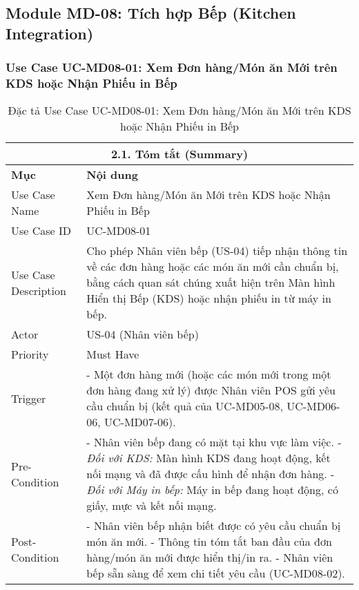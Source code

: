 \subsection{Module MD-08: Tích hợp Bếp (Kitchen Integration)}
\subsubsection{Use Case UC-MD08-01: Xem Đơn hàng/Món ăn Mới trên KDS hoặc Nhận Phiếu in Bếp}
\begin{longtable}{|m{4cm}|p{11cm}|}
\caption{Đặc tả Use Case UC-MD08-01: Xem Đơn hàng/Món ăn Mới trên KDS hoặc Nhận Phiếu in Bếp} \label{tab:uc_md08_01_final_v2} \\
\hline
\multicolumn{2}{|c|}{\textbf{2.1. Tóm tắt (Summary)}} \\
\hline
\textbf{Mục} & \textbf{Nội dung} \\
\hline
\endhead %
\hline
\endfoot %
\hline
\endlastfoot %
Use Case Name & Xem Đơn hàng/Món ăn Mới trên KDS hoặc Nhận Phiếu in Bếp \\
\hline
Use Case ID & UC-MD08-01 \\
\hline
Use Case Description & Cho phép Nhân viên bếp (US-04) tiếp nhận thông tin về các đơn hàng hoặc các món ăn mới cần chuẩn bị, bằng cách quan sát chúng xuất hiện trên Màn hình Hiển thị Bếp (KDS) hoặc nhận phiếu in từ máy in bếp. \\
\hline
Actor & US-04 (Nhân viên bếp) \\
\hline
Priority & Must Have \\
\hline
Trigger & - Một đơn hàng mới (hoặc các món mới trong một đơn hàng đang xử lý) được Nhân viên POS gửi yêu cầu chuẩn bị (kết quả của UC-MD05-08, UC-MD06-06, UC-MD07-06). \\
\hline
Pre-Condition & - Nhân viên bếp đang có mặt tại khu vực làm việc. \newline - \textit{Đối với KDS:} Màn hình KDS đang hoạt động, kết nối mạng và đã được cấu hình để nhận đơn hàng. \newline - \textit{Đối với Máy in bếp:} Máy in bếp đang hoạt động, có giấy, mực và kết nối mạng. \\
\hline
Post-Condition & - Nhân viên bếp nhận biết được có yêu cầu chuẩn bị món ăn mới. \newline - Thông tin tóm tắt ban đầu của đơn hàng/món ăn mới được hiển thị/in ra. \newline - Nhân viên bếp sẵn sàng để xem chi tiết yêu cầu (UC-MD08-02). \\

\end{longtable}
